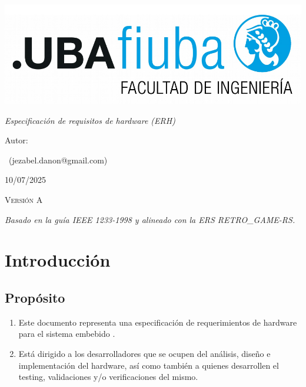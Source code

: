 \documentclass[11pt,a4paper]{article}
\newcommand{\versionActual}{A}
\newcommand{\fechaA}{10/07/2025}
\newcommand{\fechaActual}{\fechaA}
\begin{document}
\begin{titlepage}
  \centering
  \includegraphics[width=.7\textwidth]{Figuras/logoFIUBA.pdf}\par
  \vspace{1cm}
  {\Huge\textbf{\ttitle}}\par
  \vspace{1.5cm}
  {\Large\itshape Especificación de requisitos de hardware (ERH)\par}
  \vspace{3cm}
  \flushleft
  {\normalsize Autor:}\par
  {\Large \authorname\ (jezabel.danon@gmail.com)}\par
  \vspace{1.5cm}
  {\scshape\LARGE \fechaActual}\par
  {\scshape\LARGE Versión \versionActual}\par
  \vfill
  \centering
  \textit{Basado en la guía IEEE 1233-1998 y alineado con la ERS RETRO\_GAME-RS.}
\end{titlepage}

\clearpage
\tableofcontents
\clearpage

\section{Introducción}
\subsection{Propósito}
\begin{enumerate}
  \item Este documento representa una especificación de requerimientos de hardware para el sistema embebido \textit{\ttitle}. 
  \item Está dirigido a los desarrolladores que se ocupen del análisis, diseño e implementación del hardware, así como también a quienes desarrollen el testing, validaciones y/o verificaciones del mismo.
\end{enumerate}
\end{document}
